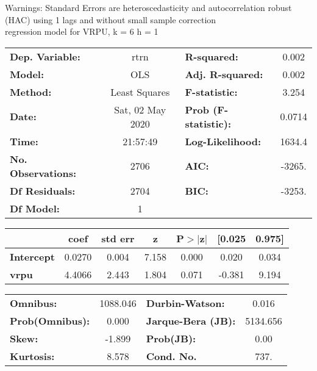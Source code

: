 Warnings: \newline
 [1] Standard Errors are heteroscedasticity and autocorrelation robust (HAC) using 1 lags and without small sample correction\\ 

regression model for VRPU, k = 6 h = 1\begin{center}
\begin{tabular}{lclc}
\toprule
\textbf{Dep. Variable:}    &       rtrn       & \textbf{  R-squared:         } &     0.002   \\
\textbf{Model:}            &       OLS        & \textbf{  Adj. R-squared:    } &     0.002   \\
\textbf{Method:}           &  Least Squares   & \textbf{  F-statistic:       } &     3.254   \\
\textbf{Date:}             & Sat, 02 May 2020 & \textbf{  Prob (F-statistic):} &   0.0714    \\
\textbf{Time:}             &     21:57:49     & \textbf{  Log-Likelihood:    } &    1634.4   \\
\textbf{No. Observations:} &        2706      & \textbf{  AIC:               } &    -3265.   \\
\textbf{Df Residuals:}     &        2704      & \textbf{  BIC:               } &    -3253.   \\
\textbf{Df Model:}         &           1      & \textbf{                     } &             \\
\bottomrule
\end{tabular}
\begin{tabular}{lcccccc}
                   & \textbf{coef} & \textbf{std err} & \textbf{z} & \textbf{P$> |$z$|$} & \textbf{[0.025} & \textbf{0.975]}  \\
\midrule
\textbf{Intercept} &       0.0270  &        0.004     &     7.158  &         0.000        &        0.020    &        0.034     \\
\textbf{vrpu}      &       4.4066  &        2.443     &     1.804  &         0.071        &       -0.381    &        9.194     \\
\bottomrule
\end{tabular}
\begin{tabular}{lclc}
\textbf{Omnibus:}       & 1088.046 & \textbf{  Durbin-Watson:     } &    0.016  \\
\textbf{Prob(Omnibus):} &   0.000  & \textbf{  Jarque-Bera (JB):  } & 5134.656  \\
\textbf{Skew:}          &  -1.899  & \textbf{  Prob(JB):          } &     0.00  \\
\textbf{Kurtosis:}      &   8.578  & \textbf{  Cond. No.          } &     737.  \\
\bottomrule
\end{tabular}
\end{center}

